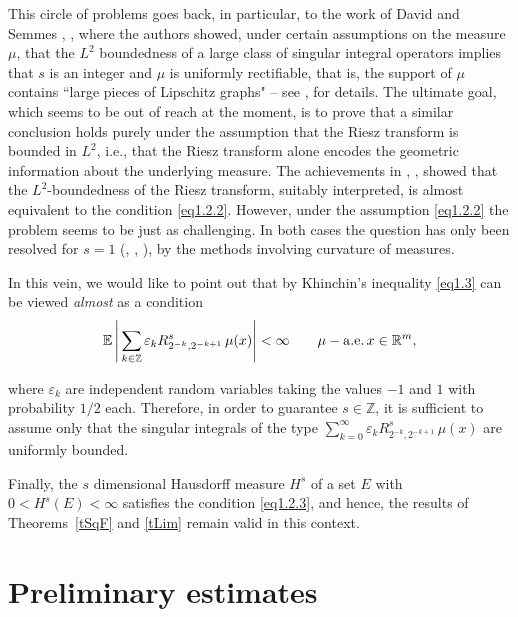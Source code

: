 \documentclass{elsart3-1}
\newcommand{\RR}{{\mathbb{R}}}
\newcommand{\ZZ}{{\mathbb{Z}}}
\newcommand{\eps}{\varepsilon}
\begin{document}
This circle of problems goes back, in particular, to the work of David and Semmes \cite{DS1}, \cite{DS2}, where the authors showed, under certain assumptions on the measure $\mu$, that the $L^2$ boundedness of a large class of  singular integral operators implies that $s$ is an integer and $\mu$ is uniformly rectifiable, that is, the support of $\mu$ contains ``large pieces of Lipschitz graphs" -- see \cite{DS1}, \cite{DS2} for details. The ultimate goal, which seems to be out of reach at the moment, is to prove that a similar conclusion holds purely under the assumption that the Riesz transform is bounded in $L^2$, i.e., that the Riesz transform alone encodes the geometric information about the underlying measure. The achievements in \cite{NTV-Acta}, \cite{VBook}, \cite{NTV-IMRNWeakType} showed that the $L^2$-boundedness of the Riesz transform, suitably interpreted, is almost equivalent to the condition \eqref{eq1.2.2}. However, under the assumption \eqref{eq1.2.2} the problem seems to be just as challenging.
In both cases the question has only been resolved for $s=1$ (\cite{MMV}, \cite{To2}, \cite{To10}), by the methods involving curvature of measures. 

In this vein, we would like to point out that by Khinchin's inequality \eqref{eq1.3} can be viewed {\it almost} as a condition
\begin{equation}\label{eq1.4}
{\mathbb{E}}\,\Bigg|\sum_{k\in\ZZ} \eps_k R^s_{2^{-k},2^{-k+1}}\, \mu(x)\Bigg|<\infty \qquad \mu - {\rm a.e.}\,x\in\RR^m,
\end{equation}

\noindent where $\eps_k$ are independent random variables taking the values $-1$ and $1$ with probability $1/2$ each. Therefore,  in order to guarantee $s\in\ZZ$, it is sufficient to assume only that the singular integrals of the type $\sum_{k=0}^{\infty} \eps_k R^s_{2^{-k},2^{-k+1}}\, \mu(x)$ are uniformly bounded.

Finally, the $s$ dimensional Hausdorff measure $H^s$ of a set $E$ with $0<H^s(E)<\infty$ satisfies the condition \eqref{eq1.2.3}, and hence, the results of Theorems~\ref{tSqF} and \ref{tLim} remain valid in this context.
 






\section{Preliminary estimates}
\end{document}
